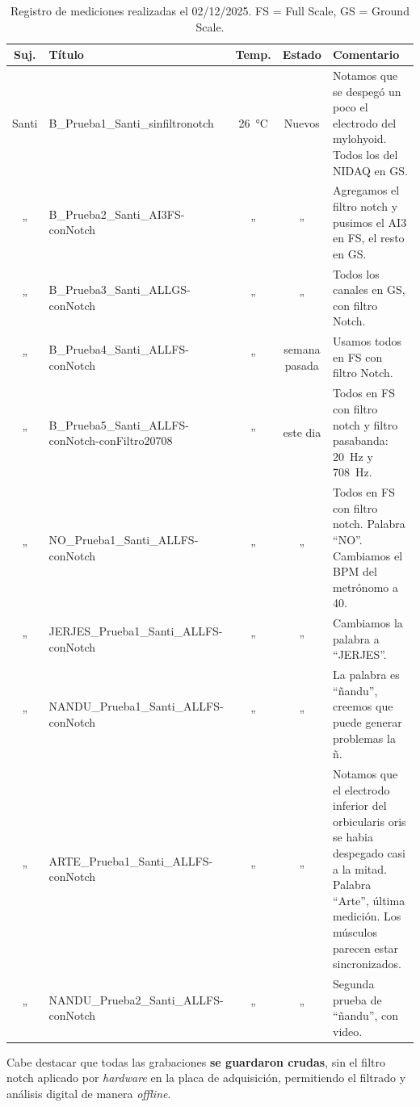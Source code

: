 \begin{table}[H]
    \centering
    \footnotesize
    \caption{Registro de mediciones realizadas el 02/12/2025. FS = Full Scale, GS = Ground Scale.}
    \label{tab:mediciones_labo6}
    \begin{tabularx}{\linewidth}{c >{\raggedright\arraybackslash}p{4.5cm} c c X}
        \toprule
        \textbf{Suj.} & \textbf{Título} & \textbf{Temp.} & \textbf{Estado} & \textbf{Comentario} \\
        \midrule
        Santi & B\_Prueba1\_Santi\_sinfiltronotch & \SI{26}{\degreeCelsius} & Nuevos & Notamos que se despegó un poco el electrodo del mylohyoid. Todos los del NIDAQ en GS. \\
        '' & B\_Prueba2\_Santi\_AI3FS-conNotch & '' & '' & Agregamos el filtro notch y pusimos el AI3 en FS, el resto en GS. \\
        '' & B\_Prueba3\_Santi\_ALLGS-conNotch & '' & '' & Todos los canales en GS, con filtro Notch. \\
        '' & B\_Prueba4\_Santi\_ALLFS-conNotch & '' & semana pasada & Usamos todos en FS con filtro Notch. \\
        '' & B\_Prueba5\_Santi\_ALLFS-conNotch-conFiltro20708 & '' & este dia & Todos en FS con filtro notch y filtro pasabanda: \SI{20}{\hertz} y \SI{708}{\hertz}. \\
        '' & NO\_Prueba1\_Santi\_ALLFS-conNotch & '' & '' & Todos en FS con filtro notch. Palabra \enquote{NO}. Cambiamos el BPM del metrónomo a 40. \\
        '' & JERJES\_Prueba1\_Santi\_ALLFS-conNotch & '' & '' & Cambiamos la palabra a \enquote{JERJES}. \\
        '' & NANDU\_Prueba1\_Santi\_ALLFS-conNotch & '' & '' & La palabra es \enquote{ñandu}, creemos que puede generar problemas la ñ. \\
        '' & ARTE\_Prueba1\_Santi\_ALLFS-conNotch & '' & '' & Notamos que el electrodo inferior del orbicularis oris se habia despegado casi a la mitad. Palabra \enquote{Arte}, última medición. Los músculos parecen estar sincronizados. \\
        '' & NANDU\_Prueba2\_Santi\_ALLFS-conNotch & '' & '' & Segunda prueba de \enquote{ñandu}, con video. \\
        \bottomrule
    \end{tabularx}
\end{table}

Cabe destacar que todas las grabaciones \textbf{se guardaron crudas}, sin el filtro notch aplicado por \textit{hardware} en la placa de adquisición, permitiendo el filtrado y análisis digital de manera \textit{offline}.

